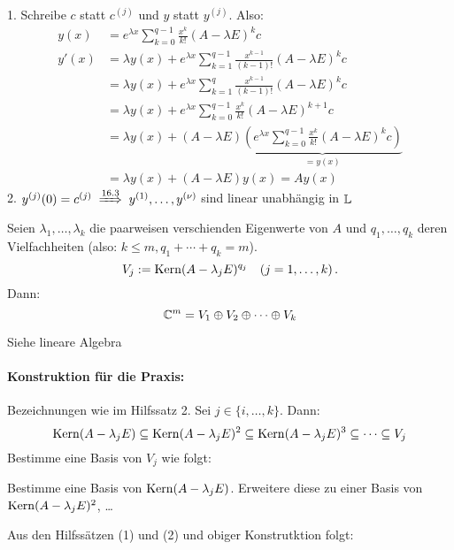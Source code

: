 \documentclass[a4paper,twoside,DIV15,BCOR12mm]{scrbook}
\begin{document}
\begin{beweis}
1. Schreibe $c$ statt $c^{(j)}$ und $y$ statt $y^{(j)}$. Also:
\begin{align*}
y(x) &= e^{\lambda x} \sum_{k=0}^{q-1} \frac{x^k}{k!} (A-\lambda E)^k c \\
y'(x) &= \lambda y(x) + e^{\lambda x} \sum_{k=1}^{q-1} \frac{x^{k-1}}{(k-1)!} (A-\lambda E)^k c \\
& = \lambda y(x) + e^{\lambda x}  \sum_{k=1}^{q} \frac{x^{k-1}}{(k-1)!} (A-\lambda E)^k c \\
& = \lambda y(x) + e^{\lambda x}  \sum_{k=0}^{q-1} \frac{x^{k}}{k!} (A-\lambda E)^{k+1} c \\
& = \lambda y(x) + (A-\lambda E) \underbrace{\left( e^{\lambda x}  \sum_{k=0}^{q-1} \frac{x^{k}}{k!} (A-\lambda E)^k c\right) }_{=y(x)} \\
& = \lambda y(x) + (A-\lambda E) y(x) = Ay(x)
\end{align*}
2. $y^{(j)}(0) = c^{(j)} \folgtnach{16.3} y^{(1)},\ldots, y^{(\nu)}$ sind linear unabhängig in $\mathbb{L}$
\end{beweis}

\begin{hilfssatz}[2]
Seien $\lambda_1,\ldots,\lambda_k$ die paarweisen verschienden Eigenwerte von $A$ und $q_1,\ldots,q_k$ deren Vielfachheiten (also: $k\le m, q_1+\cdots+q_k=m$). 
\[ V_j := \mathop{\rm Kern}\nolimits (A-\lambda_jE)^{q_j}\quad(j=1,\ldots,k)\,.\]
Dann:
\[\mathbb{C}^m = V_1\oplus V_2 \oplus \cdots \oplus V_k\]
\end{hilfssatz}

\begin{beweis}
Siehe lineare Algebra
\end{beweis}

\paragraph{Konstruktion für die Praxis:}
Bezeichnungen wie im Hilfssatz 2. Sei $j\in\{i,\ldots,k\}$. Dann:
\[\mathop{\rm Kern}\nolimits (A-\lambda_j E)\subseteq \mathop{\rm Kern}\nolimits(A-\lambda_jE)^2\subseteq \mathop{\rm Kern}\nolimits(A-\lambda_jE)^3\subseteq \cdots \subseteq V_j\]
Bestimme eine Basis von $V_j$ wie folgt:

Bestimme eine Basis von $\mathop{\rm Kern}\nolimits(A-\lambda_jE)$. Erweitere diese zu einer Basis von $\mathop{\rm Kern}\nolimits(A-\lambda_jE)^2$, \ldots

Aus den Hilfssätzen (1) und (2) und obiger Konstrutktion folgt:
\end{document}
